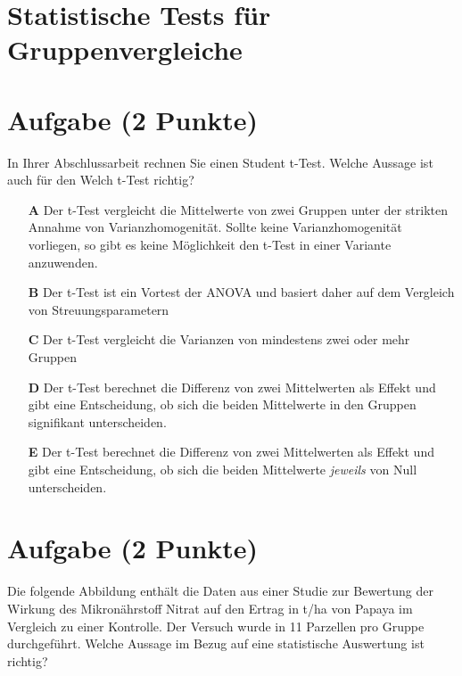 \documentclass[a4paper, 9pt]{scrartcl}\usepackage[]{graphicx}\usepackage[]{xcolor}
\begin{document}
\section*{Statistische Tests für Gruppenvergleiche} 

\section{Aufgabe \hfill (2 Punkte)}



In Ihrer Abschlussarbeit rechnen Sie einen Student t-Test. Welche Aussage ist auch für den Welch t-Test richtig?



\begin{enumerate}
\item [\textbf{A} \msquare] Der t-Test vergleicht die Mittelwerte von zwei Gruppen unter der strikten Annahme von Varianzhomogenität. Sollte keine Varianzhomogenität vorliegen, so gibt es keine Möglichkeit den t-Test in einer Variante anzuwenden.
\item [\textbf{B} \msquare] Der t-Test ist ein Vortest der ANOVA und basiert daher auf dem Vergleich von Streuungsparametern
\item [\textbf{C} \msquare] Der t-Test vergleicht die Varianzen von mindestens zwei oder mehr Gruppen
\item [\textbf{D} \msquare] Der t-Test berechnet die Differenz von zwei Mittelwerten als Effekt und gibt eine Entscheidung, ob sich die beiden Mittelwerte in den Gruppen signifikant unterscheiden.
\item [\textbf{E} \msquare] Der t-Test berechnet die Differenz von zwei Mittelwerten als Effekt und gibt eine Entscheidung, ob sich die beiden Mittelwerte \textit{jeweils} von Null unterscheiden.
\end{enumerate}

\section{Aufgabe \hfill (2 Punkte)}



Die folgende Abbildung enthält die Daten aus einer Studie zur Bewertung der Wirkung des Mikronährstoff Nitrat auf den Ertrag in t/ha von Papaya im Vergleich zu einer Kontrolle. Der Versuch wurde in 11 Parzellen pro Gruppe durchgeführt. Welche Aussage im Bezug auf eine statistische Auswertung ist richtig?
\end{document}
